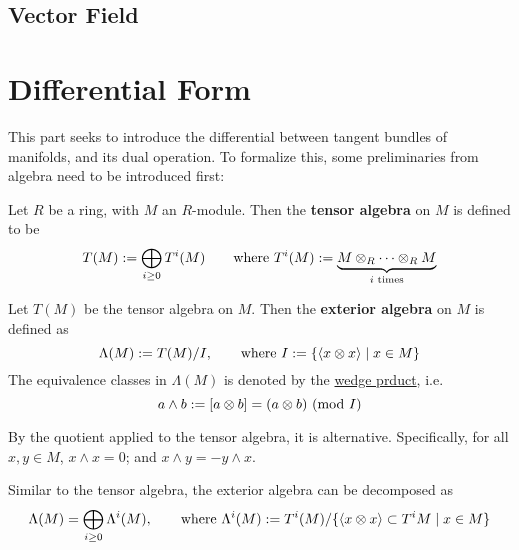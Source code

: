 \documentclass{article}
\begin{document}
\subsection{Vector Field}


\section{Differential Form}

This part seeks to introduce the differential between tangent bundles of manifolds, and its dual operation. To formalize this, some preliminaries from algebra need to be introduced first:

\begin{definition}
    Let $R$ be a ring, with $M$ an $R$-module. Then the \textbf{tensor algebra} on $M$ is defined to be
    \[
        T(M) := \bigoplus_{i \geq 0} T^i(M) \qquad\text{where } T^i(M) := \underbrace{M \otimes_R \cdots \otimes_R M}_{i \text{ times}}
    \]
\end{definition}

\begin{definition}
    Let $T(M)$ be the tensor algebra on $M$. Then the \textbf{exterior algebra} on $M$ is defined as
    \[
        \Lambda(M) := T(M) / I , \qquad \text{where } I := \left\{ \left\langle x \otimes x \right\rangle \mid x \in M \right\}
    \]
    The equivalence classes in $\Lambda(M)$ is denoted by the \underline{wedge prduct}, i.e.
    \[
        a \wedge b := [a \otimes b] = (a \otimes b) \ (\text{mod}\ I)
    \]
\end{definition}

\begin{remark}
    By the quotient applied to the tensor algebra, it is alternative. Specifically, for all $x, y \in M$, $x \wedge x = 0$; and $x \wedge y = -y \wedge x$.
\end{remark}

\begin{remark}
    Similar to the tensor algebra, the exterior algebra can be decomposed as
    \[
        \Lambda(M) = \bigoplus_{i \geq 0} \Lambda^i(M), \qquad \text{where } \Lambda^i(M) := T^i(M) / \{ \left\langle x \otimes x \right\rangle \subset T^i M \mid x \in M \}
    \]
\end{remark}
\end{document}
